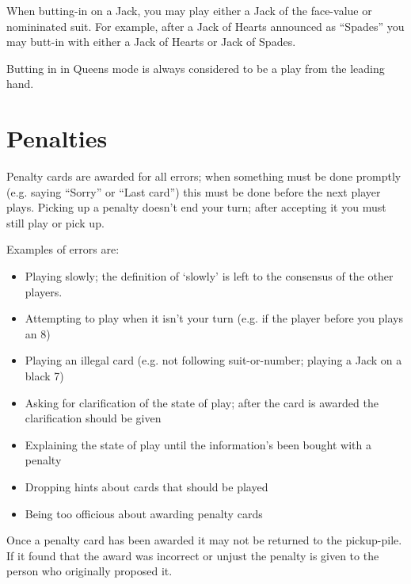 \documentclass[12pt]{article}
\begin{document}
When butting-in on a Jack, you may play either a Jack of the face-value or nomininated suit. For
example, after a Jack of Hearts announced as ``Spades'' you may butt-in with either
a Jack of Hearts or Jack of Spades.

Butting in in Queens mode is always considered to be a play from the leading hand.

\section{Penalties}
\label{penalties}

Penalty cards are awarded for all errors;  when something must be done promptly (e.g. saying ``Sorry'' or
``Last card'') this must be done before the next player plays.  Picking up a penalty doesn't
end your turn;  after accepting it you must still play or pick up.

Examples of errors are:

\begin{itemize}
  \item Playing slowly;  the definition of `slowly' is left to the consensus of the other players.

  \item Attempting to play when it isn't your turn (e.g. if the player before you plays an 8)

  \item Playing an illegal card (e.g. not following suit-or-number;  playing a Jack on a black 7)

  \item Asking for clarification of the state of play;  after the card is awarded the
    clarification should be given

  \item Explaining the state of play until the information's been bought with a penalty

  \item Dropping hints about cards that should be played

  \item Being too officious about awarding penalty cards
\end{itemize}

Once a penalty card has been awarded it may not be returned to the pickup-pile.  If it found that the award was
incorrect or unjust the penalty is given to the person who originally proposed it.
\end{document}
